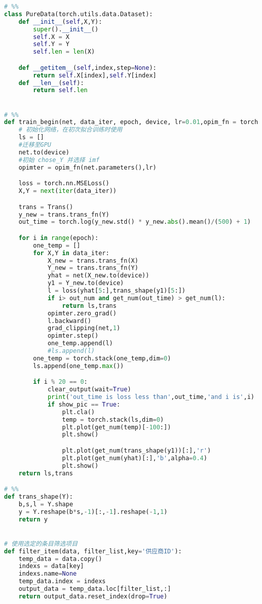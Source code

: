 \begin{appendices}
\begin{lstlisting}[language=python]
# %%
class PureData(torch.utils.data.Dataset):
    def __init__(self,X,Y):
        super().__init__()
        self.X = X
        self.Y = Y
        self.len = len(X)

    def __getitem__(self,index,step=None):
        return self.X[index],self.Y[index]
    def __len__(self):
        return self.len


# %%
def train_begin(net, data_iter, epoch, device, lr=0.01,opim_fn = torch.optim.Adam,out_num = 1000, show_pic = True):
    # 初始化网络，在初次拟合训练时使用
    ls = []
    #迁移至GPU
    net.to(device)
    #初始 chose_Y 并选择 imf
    opimter = opim_fn(net.parameters(),lr)

    loss = torch.nn.MSELoss()
    X,Y = next(iter(data_iter))

    trans = Trans()
    y_new = trans.trans_fn(Y)
    out_time = torch.log(y_new.std() * y_new.abs().mean()/(500) + 1)

    for i in range(epoch):
        one_temp = []
        for X,Y in data_iter:
            X_new = trans.trans_fn(X)
            Y_new = trans.trans_fn(Y)
            yhat = net(X_new.to(device))
            y1 = Y_new.to(device)
            l = loss(yhat[5:],trans_shape(y1)[5:])
            if i> out_num and get_num(out_time) > get_num(l):
                return ls,trans
            opimter.zero_grad()
            l.backward()
            grad_clipping(net,1)
            opimter.step()
            one_temp.append(l)
            #ls.append(l)
        one_temp = torch.stack(one_temp,dim=0)
        ls.append(one_temp.max())

        if i % 20 == 0:
            clear_output(wait=True)
            print('out_time is loss less than',out_time,'and i is',i)
            if show_pic == True:
                plt.cla()
                temp = torch.stack(ls,dim=0)
                plt.plot(get_num(temp)[-100:])
                plt.show()

                plt.plot(get_num(trans_shape(y1))[:],'r')
                plt.plot(get_num(yhat)[:],'b',alpha=0.4)
                plt.show()
    return ls,trans

# %%
def trans_shape(Y):
    b,s,l = Y.shape
    y = Y.reshape(b*s,-1)[:,-1].reshape(-1,1)
    return y


# 使用选定的条目筛选项目
def filter_item(data, filter_list,key='供应商ID'):
    temp_data = data.copy()
    indexs = data[key]
    indexs.name=None
    temp_data.index = indexs
    output_data = temp_data.loc[filter_list,:]
    return output_data.reset_index(drop=True)


\end{lstlisting}
\end{appendices}
